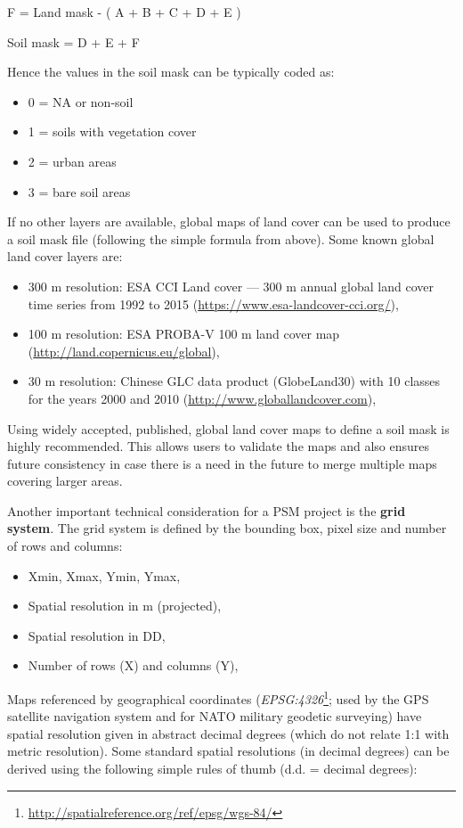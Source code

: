 \documentclass[graybox,natbib,nospthms,UStrade]{svmono}
\providecommand{\tightlist}{%
  \setlength{\itemsep}{0pt}\setlength{\parskip}{0pt}}
\providecommand{\tightlist}{\setlength{\itemsep}{0pt}\setlength{\parskip}{0pt}}
\renewcommand{\href}[2]{#2 (\url{#1})}
\renewcommand{\href}[2]{#2\footnote{\url{#1}}}
\begin{document}
F = Land mask - ( A + B + C + D + E )

Soil mask = D + E + F

Hence the values in the soil mask can be typically coded as:

\begin{itemize}
\item
  0 = NA or non-soil
\item
  1 = soils with vegetation cover
\item
  2 = urban areas
\item
  3 = bare soil areas
\end{itemize}

If no other layers are available, global maps of land cover can be used
to produce a soil mask file (following the simple formula from above).
Some known global land cover layers are:

\begin{itemize}
\item
  300 m resolution: ESA CCI Land cover --- 300 m annual global land
  cover time series from 1992 to 2015
  (\url{https://www.esa-landcover-cci.org/}),
\item
  100 m resolution: ESA PROBA-V 100 m land cover map
  (\url{http://land.copernicus.eu/global}),
\item
  30 m resolution: Chinese GLC data product (GlobeLand30) with 10
  classes for the years 2000 and 2010
  (\url{http://www.globallandcover.com}),
\end{itemize}

Using widely accepted, published, global land cover maps to define a
soil mask is highly recommended. This allows users to validate the maps
and also ensures future consistency in case there is a need in the
future to merge multiple maps covering larger areas.

Another important technical consideration for a PSM project is the
\textbf{grid system}. The grid system is defined by the bounding box, pixel
size and number of rows and columns:

\begin{itemize}
\tightlist
\item
  Xmin, Xmax, Ymin, Ymax,
\item
  Spatial resolution in m (projected),
\item
  Spatial resolution in DD,
\item
  Number of rows (X) and columns (Y),
\end{itemize}

Maps referenced by geographical coordinates
(\href{http://spatialreference.org/ref/epsg/wgs-84/}{\emph{EPSG:4326}}; used by
the GPS satellite navigation system and for NATO military geodetic
surveying) have spatial resolution given in abstract decimal degrees
(which do not relate 1:1 with metric resolution). Some standard spatial
resolutions (in decimal degrees) can be derived using the following
simple rules of thumb (d.d. = decimal degrees):
\end{document}
